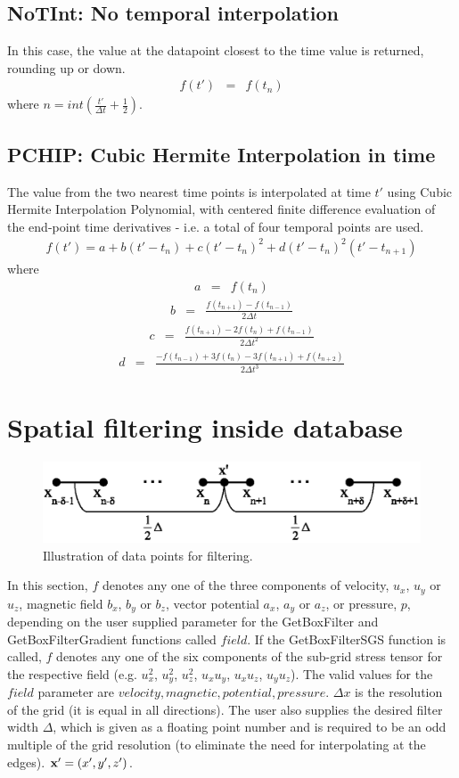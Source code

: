 \documentclass[11pt]{article}
\def\bea{\begin{eqnarray}}
\def\eea{\end{eqnarray}}
\begin{document}
\subsection*{NoTInt: No temporal interpolation}

In this case, the value at the datapoint closest to the time value
is returned, rounding up or down. \bea f(t') &=& f(t_n)\eea where
$n=int(\frac{t'}{\Delta t}+\frac{1}{2})$.

\subsection*{PCHIP: Cubic Hermite Interpolation in time}

The value from the two nearest time points is interpolated at time $t'$
using Cubic Hermite Interpolation Polynomial, with centered finite
difference evaluation of the end-point time derivatives - i.e. a
total of four temporal points are used. \bea
f(t')=a+b(t'-t_n)+c(t'-t_n)^2+d(t'-t_n)^2(t'-t_{n+1}) \eea where
\bea a &=& f(t_n)\nonumber\eea \bea b &=&
\frac{f(t_{n+1})-f(t_{n-1})}{2\Delta t}\nonumber\eea \bea c &=&
\frac{f(t_{n+1})-2f(t_n)+f(t_{n-1})}{2\Delta t^2}\nonumber\eea
\bea d &=&
\frac{-f(t_{n-1})+3f(t_n)-3f(t_{n+1})+f(t_{n+2})}{2\Delta t^3}
\nonumber\eea

\section{Spatial filtering inside database} 

\begin{figure}[ht]
\begin{minipage}{\linewidth}
\centering\includegraphics[width=0.8\linewidth]{Filtering.eps}
\end{minipage} \caption{Illustration of data points for filtering.}\label{filtering}
\end{figure}

In this section, $f$ denotes any one of the three components of velocity, $u_x$, $u_y$ or $u_z$, 
magnetic field $b_x$, $b_y$ or $b_z$, vector potential $a_x$, $a_y$ or $a_z$, or pressure, $p$,  
depending on the user supplied parameter for the GetBoxFilter and GetBoxFilterGradient functions called $field$. If the 
GetBoxFilterSGS function is called, $f$ denotes any one of the six components of the sub-grid
stress tensor for the respective field (e.g. $u_x^2$, $u_y^2$, $u_z^2$, $u_x u_y$, $u_x u_z$, $u_y u_z$).
The valid values
for the $field$ parameter are $velocity, magnetic, potential, pressure$. $\Delta x$ is the resolution of the grid
(it is equal in all directions). The user also supplies the desired 
filter width $\Delta$, which is given as a floating point number and is required to be an odd multiple of the grid
resolution (to eliminate the need for interpolating at the edges). ${\bf x'}=(x',y',z')$. 
\end{document}
